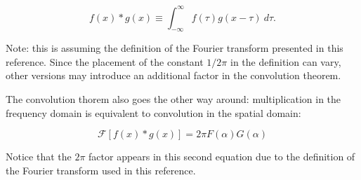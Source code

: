 \begin{equation*}
    f(x) \ast g(x) \equiv \int_{-\infty}^\infty f(\tau)g(x-\tau)~d\tau\text{.}
\end{equation*}

Note: this is assuming the definition of the Fourier transform presented in this reference. Since the placement of the constant $1/2\pi$ in the definition can vary, other versions may introduce an additional factor in the convolution theorem.

\vsp

The convolution thorem also goes the other way around: multiplication in the frequency domain is equivalent to convolution in the spatial domain:

\begin{equation*}
    \mathcal{F}\left[f(x) \ast g(x)\right] = 2\pi F(\alpha) G(\alpha)
\end{equation*}

Notice that the $2\pi$ factor appears in this second equation due to the definition of the Fourier transform used in this reference.